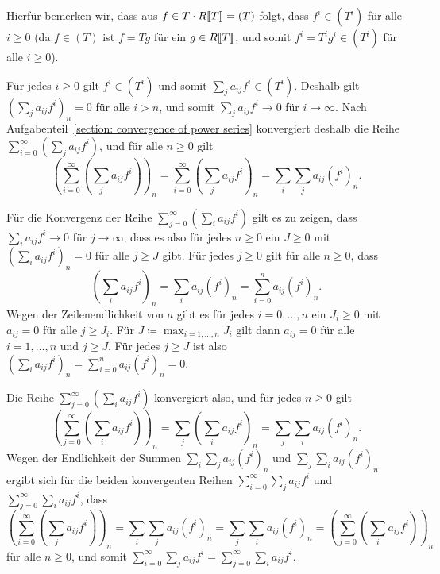 \documentclass[a4paper, 10pt, numbers=noenddot]{scrartcl}
\begin{document}
Hierfür bemerken wir, dass aus $f \in T \cdot R[\![T]\!] = (T)$ folgt, dass $f^i \in (T^i)$ für alle $i \geq 0$ (da $f \in (T)$ ist $f = T g$ für ein $g \in R[\![T]\!]$, und somit $f^i = T^i g^i \in (T^i)$ für alle $i \geq 0$).

Für jedes $i \geq 0$ gilt $f^i \in (T^i)$ und somit $\sum_j a_{ij} f^i \in (T^i)$.
Deshalb gilt $(\sum_j a_{ij} f^i)_n = 0$ für alle $i > n$, und somit $\sum_j a_{ij} f^i \to 0$ für $i \to \infty$.
Nach Aufgabenteil~\ref{section: convergence of power series} konvergiert deshalb die Reihe $\sum_{i=0}^\infty (\sum_j a_{ij} f^i)$, und für alle $n \geq 0$ gilt
\[
    \left( \sum_{i=0}^\infty \left( \sum_j a_{ij} f^i \right) \right)_{\!\!\!n}
  = \sum_{i=0}^\infty \left( \sum_j a_{ij} f^i \right)_{\!\!\!n}
  = \sum_i \sum_j a_{ij} (f^i)_n.
\]

Für die Konvergenz der Reihe $\sum_{j=0}^\infty (\sum_i a_{ij} f^i)$ gilt es zu zeigen, dass $\sum_i a_{ij} f^i \to 0$ für $j \to \infty$, dass es also für jedes $n \geq 0$ ein $J \geq 0$ mit $(\sum_i a_{ij} f^i)_n = 0$ für alle $j \geq J$ gibt.
Für jedes $j \geq 0$ gilt für alle $n \geq 0$, dass
\[
    \left( \sum_i a_{ij} f^i \right)_{\!\!\!n}
  = \sum_i a_{ij} (f^i)_n
  = \sum_{i=0}^n a_{ij} (f^i)_n.
\]
Wegen der Zeilenendlichkeit von $a$ gibt es für jedes $i = 0, \dotsc, n$ ein $J_i \geq 0$ mit $a_{ij} = 0$ für alle $j \geq J_i$.
Für $J \coloneqq \max_{i=1, \dotsc, n} J_i$ gilt dann $a_{ij} = 0$ für alle $i = 1, \dotsc, n$ und $j \geq J$.
Für jedes $j \geq J$ ist also $(\sum_i a_{ij} f^i)_n = \sum_{i=0}^n a_{ij} (f^i)_n = 0$.

Die Reihe $\sum_{j=0}^\infty (\sum_i a_{ij} f^i)$ konvergiert also, und für jedes $n \geq 0$ gilt
\[
    \left( \sum_{j=0}^\infty \left( \sum_i a_{ij} f^i \right) \right)_{\!\!\!n} 
  = \sum_j \left( \sum_i a_{ij} f^i \right)_{\!\!\!n}
  = \sum_j \sum_i a_{ij} (f^i)_n.
\]
Wegen der Endlichkeit der Summen $\sum_i \sum_j a_{ij} (f^i)_n$ und $\sum_j \sum_i a_{ij} (f^i)_n$ ergibt sich für die beiden konvergenten Reihen $\sum_{i=0}^\infty \sum_j a_{ij} f^i$ und $\sum_{j=0}^\infty \sum_i a_{ij} f^i$, dass
\[
    \left( \sum_{i=0}^\infty \left( \sum_j a_{ij} f^i \right) \right)_{\!\!\!n}
  = \sum_i \sum_j a_{ij} (f^i)_n
  = \sum_j \sum_i a_{ij} (f^i)_n
  = \left( \sum_{j=0}^\infty \left( \sum_i a_{ij} f^i \right) \right)_{\!\!\!n}
\]
für alle $n \geq 0$, und somit $\sum_{i=0}^\infty \sum_j a_{ij} f^i = \sum_{j=0}^\infty \sum_i a_{ij} f^i$.
\end{document}
